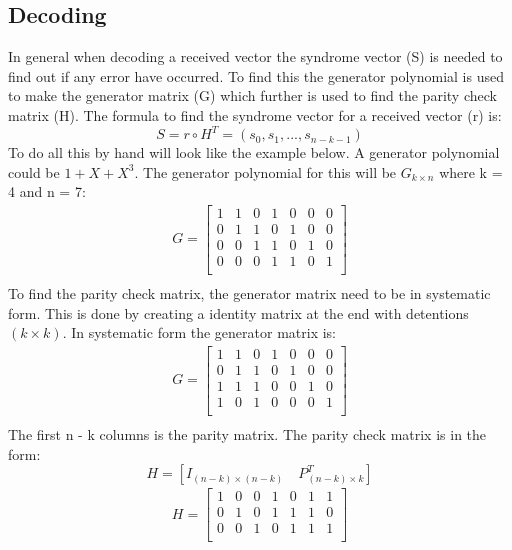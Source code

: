\documentclass[Main]{subfiles}
\begin{document}
\subsection{Decoding}
In general when decoding a received vector the syndrome vector (S) is needed to find out if any error have occurred.
To find this the generator polynomial is used to make the generator matrix (G) which further is used to find the parity check matrix (H).
The formula to find the syndrome vector for a received vector (r) is:
\begin{equation}
S = r \circ H^T = (s_{0},s_{1}, ..., s_{n-k-1})
\end{equation}
To do all this by hand will look like the example below.
A generator polynomial could be $1+X+X^3$. 
The generator polynomial for this will be $G_{k \times n}$ where k = 4 and n = 7:
\begin{align*}
G =
\begin{bmatrix}
1 & 1 & 0 & 1 & 0 & 0 & 0\\
0 & 1 & 1 & 0 & 1 & 0 & 0\\
0 & 0 & 1 & 1 & 0 & 1 & 0\\
0 & 0 & 0 & 1 & 1 & 0 & 1\\
\end{bmatrix} \\
\end{align*}
To find the parity check matrix, the generator matrix need to be in systematic form.
This is done by creating a identity matrix at the end with detentions $(k \times k)$.
In systematic form the generator matrix is:
\begin{align*}
G =
\begin{bmatrix}
1 & 1 & 0 & 1 & 0 & 0 & 0\\
0 & 1 & 1 & 0 & 1 & 0 & 0\\
1 & 1 & 1 & 0 & 0 & 1 & 0\\
1 & 0 & 1 & 0 & 0 & 0 & 1\\
\end{bmatrix} \\
\end{align*}
The first n - k columns is the parity matrix.
The parity check matrix is in the form:
\begin{equation}
H = [I_{(n-k) \times (n-k)} \quad P^T_{(n-k) \times k}]
\end{equation}
\begin{align*}
H =
\begin{bmatrix}
1 & 0 & 0 & 1 & 0 & 1 & 1\\
0 & 1 & 0 & 1 & 1 & 1 & 0\\
0 & 0 & 1 & 0 & 1 & 1 & 1\\
\end{bmatrix} \\
\end{align*}
\end{document}
